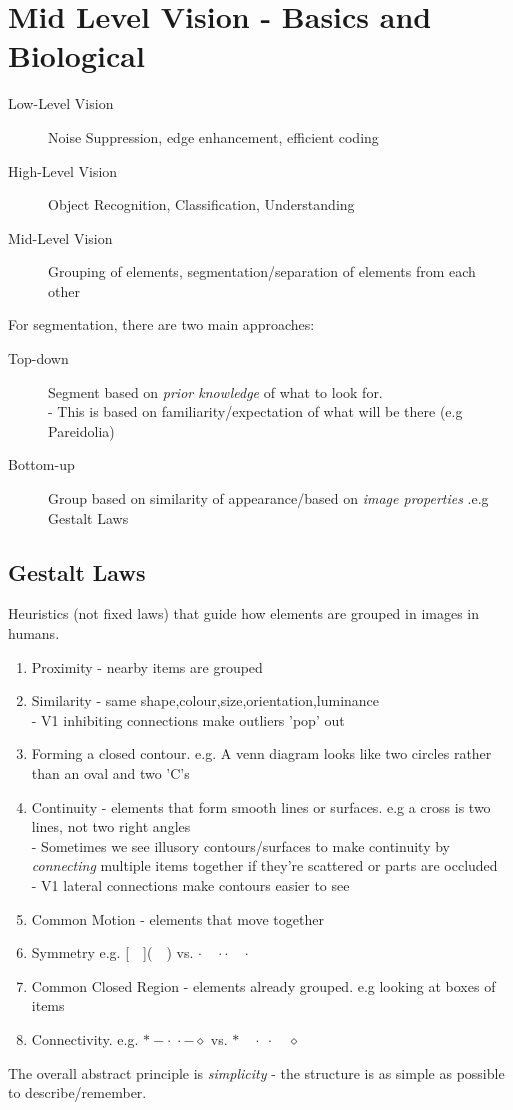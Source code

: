 \section{Mid Level Vision - Basics and Biological}
\begin{description}
    \item[Low-Level Vision] Noise Suppression, edge enhancement, efficient coding
    \item[High-Level Vision] Object Recognition, Classification, Understanding
    \item[Mid-Level Vision] Grouping of elements, segmentation/separation of elements from each other
\end{description}

For segmentation, there are two main approaches:
\begin{description}
    \item [Top-down] Segment based on \emph{prior knowledge} of what to look for. \\ \quad \quad - This is based on familiarity/expectation of what will be there (e.g Pareidolia)
    \item [Bottom-up] Group based on similarity of appearance/based on \emph{image properties} .e.g Gestalt Laws 
\end{description}

\subsection{Gestalt Laws}
Heuristics (not fixed laws) that guide how elements are grouped in images in humans. 
\begin{enumerate}
    \item Proximity - nearby items are grouped
    \item Similarity - same shape,colour,size,orientation,luminance \\ \quad \quad - V1 inhibiting connections make outliers 'pop' out
    \item Forming a closed contour. e.g. A venn diagram looks like two circles rather than an oval and two 'C's
    \item Continuity - elements that form smooth lines or surfaces. e.g a cross is two lines, not two right angles \\ \quad \quad - Sometimes we see illusory contours/surfaces  to make continuity by \emph{connecting} multiple items together if they're scattered or parts are occluded \\ \quad \quad - V1 lateral connections make contours easier to see
    \item Common Motion - elements that move together
    \item Symmetry e.g. [$\quad$]($\quad$) vs. $\cdot\quad\cdot\cdot\quad\cdot$ 
    \item Common Closed Region - elements already grouped. e.g looking at boxes of items 
    \item Connectivity. e.g. $\ast-\cdot\;\cdot-\diamond$ vs. $\ast\quad\cdot\;\cdot\quad\diamond$
\end{enumerate}
The overall abstract principle is \emph{simplicity} - the structure is as simple as possible to describe/remember.

